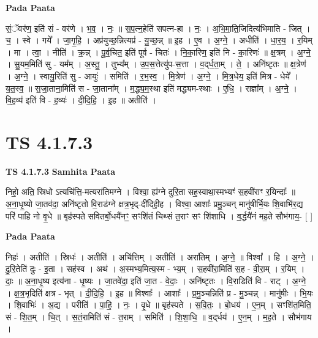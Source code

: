 \documentclass[17pt]{extarticle}
\begin{document}
\textbf{Pada Paata} \newline

सं॒ॅवर॑ण॒ इति॑ सं - वर॑णे । भ॒व॒ । नः॒ ॥ स॒प॒त्न॒हेति॑ सपत्न-हा । नः॒ । अ॒भि॒मा॒ति॒जिदित्य॑भिमाति - जित् । च॒ । स्वे । गये᳚ । जा॒गृ॒हि॒ । अप्र॑युच्छ॒न्नित्यप्र॑ - यु॒च्छ॒न्न् ॥ इ॒ह । ए॒व । अ॒ग्ने॒ । अधीति॑ । धा॒र॒य॒ । र॒यिम् । मा । त्वा॒ । नीति॑ । क्र॒न्न् । पू॒र्व॒चित॒ इति॑ पूर्व - चितः॑ । नि॒का॒रिण॒ इति॑ नि - का॒रिणः॑ ॥ क्ष॒त्रम् । अ॒ग्ने॒ । सु॒यम॒मिति॑ सु - यम᳚म् । अ॒स्तु॒ । तुभ्य᳚म् । उ॒प॒स॒त्तेत्यु॑प-स॒त्ता । व॒द्‌र्ध॒ता॒म् । ते॒ । अनि॑ष्टृतः ॥ क्ष॒त्रेण॑ । अ॒ग्ने॒ । स्वायु॒रिति॑ सु - आयुः॑ । समिति॑ । र॒भ॒स्व॒ । मि॒त्रेण॑ । अ॒ग्ने॒ । मि॒त्र॒धेय॒ इति॑ मित्र - धेये᳚ । य॒त॒स्व॒ ॥ स॒जा॒ताना॒मिति॑ स - जा॒ताना᳚म् । म॒द्ध्य॒म॒स्था इति॑ मद्ध्यम-स्थाः । ए॒धि॒ । राज्ञा᳚म् । अ॒ग्ने॒ । वि॒ह॒व्य॑ इति॑ वि - ह॒व्यः॑ । दी॒दि॒हि॒ । इ॒ह ॥ अतीति॑ ।  \newline




\section*{ TS 4.1.7.3 }

\textbf{TS 4.1.7.3 } \newline
\textbf{Samhita Paata} \newline

निहो॒ अति॒ स्रिधो ऽत्यचि॑त्ति॒-मत्यरा॑तिमग्ने । विश्वा॒ ह्य॑ग्ने दुरि॒ता सह॒स्वाथा॒स्मभ्यꣳ॑ स॒हवी॑राꣳ र॒यिन्दाः᳚ ॥ अ॒ना॒धृ॒ष्यो जा॒तव॑दा॒ अनि॑ष्टृतो वि॒राड॑ग्ने क्षत्र॒भृद्-दी॑दिही॒ह । विश्वा॒ आशाः᳚ प्रमु॒ञ्चन् मानु॑षीर्भि॒यः शि॒वाभि॑र॒द्य परि॑ पाहि नो वृ॒धे ॥ बृह॑स्पते सवितर्बो॒धयै॑नꣳ॒॒ सꣳशि॑तं चिथ्सं त॒राꣳ सꣳ शि॑शाधि । व॒र्द्धयै॑नं मह॒ते सौभ॑गाय॒- [  ] \newline

\textbf{Pada Paata} \newline

निहः॑ । अतीति॑ । स्रिधः॑ । अतीति॑ । अचि॑त्तिम् । अतीति॑ । अरा॑तिम् । अ॒ग्ने॒ ॥ विश्वा᳚ । हि । अ॒ग्ने॒ । दु॒रि॒तेति॑ दुः - इ॒ता । सह॑स्व । अथ॑ । अ॒स्मभ्य॒मित्य॒स्म - भ्य॒म् । स॒हवी॑रा॒मिति॑ स॒ह - वी॒रा॒म् । र॒यिम् । दाः॒ ॥ अ॒ना॒धृ॒ष्य इत्य॑ना - धृ॒ष्यः । जा॒तवे॑दा॒ इति॑ जा॒त - वे॒दाः॒ । अनि॑ष्टृतः । वि॒राडिति॑ वि - राट् । अ॒ग्ने॒ । क्ष॒त्र॒भृदिति॑ क्षत्र - भृत् । दी॒दि॒हि॒ । इ॒ह ॥ विश्वाः᳚ । आशाः᳚ । प्र॒मु॒ञ्चन्निति॑ प्र - मु॒ञ्चन्न् । मानु॑षीः । भि॒यः । शि॒वाभिः॑ । अ॒द्य । परीति॑ । पा॒हि॒ । नः॒ । वृ॒धे ॥ बृह॑स्पते । स॒वि॒तः॒ । बो॒धय॑ । ए॒न॒म् । सꣳशि॑त॒मिति॒ सं - शि॒त॒म् । चि॒त् । स॒तं॒रामिति॑ सं - त॒राम् । समिति॑ । शि॒शा॒धि॒ ॥ व॒द्‌र्धय॑ । ए॒न॒म् । म॒ह॒ते । सौभ॑गाय ।  \newline
\end{document}
